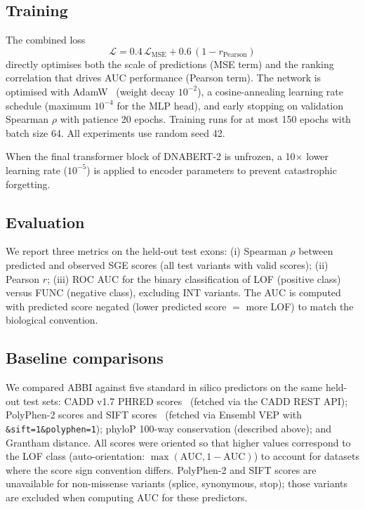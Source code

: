 \documentclass[12pt]{article}
\newcommand{\abbi}{\textsc{ABBI}}
\begin{document}
\subsection{Training}

The combined loss
\begin{equation}
  \mathcal{L} = 0.4\,\mathcal{L}_{\text{MSE}} + 0.6\,(1 - r_{\text{Pearson}})
  \label{eq:loss}
\end{equation}
directly optimises both the scale of predictions (MSE term) and the ranking
correlation that drives AUC performance (Pearson term).
The network is optimised with AdamW~\citep{adamw} (weight decay $10^{-2}$),
a cosine-annealing learning rate schedule (maximum $10^{-4}$ for the MLP head),
and early stopping on validation Spearman $\rho$ with patience 20 epochs.
Training runs for at most 150 epochs with batch size 64.
All experiments use random seed 42.

When the final transformer block of DNABERT-2 is unfrozen, a 10$\times$ lower learning
rate ($10^{-5}$) is applied to encoder parameters to prevent catastrophic forgetting.

\subsection{Evaluation}

We report three metrics on the held-out test exons:
(i) Spearman $\rho$ between predicted and observed SGE scores (all test variants with
valid scores);
(ii) Pearson $r$;
(iii) ROC AUC for the binary classification of LOF (positive class) versus FUNC
(negative class), excluding INT variants.
The AUC is computed with predicted score negated (lower predicted score $=$ more LOF)
to match the biological convention.

\subsection{Baseline comparisons}

We compared \abbi{} against five standard in silico predictors on the same held-out
test sets:
CADD v1.7 PHRED scores~\citep{cadd} (fetched via the CADD REST API);
PolyPhen-2 scores and SIFT scores~\citep{polyphen2,sift} (fetched via Ensembl VEP
with \texttt{\&sift=1\&polyphen=1});
phyloP 100-way conservation (described above);
and Grantham distance.
All scores were oriented so that higher values correspond to the LOF class
(auto-orientation: $\max(\text{AUC}, 1 - \text{AUC})$) to account for datasets
where the score sign convention differs.
PolyPhen-2 and SIFT scores are unavailable for non-missense variants (splice, synonymous,
stop); those variants are excluded when computing AUC for these predictors.
\end{document}
